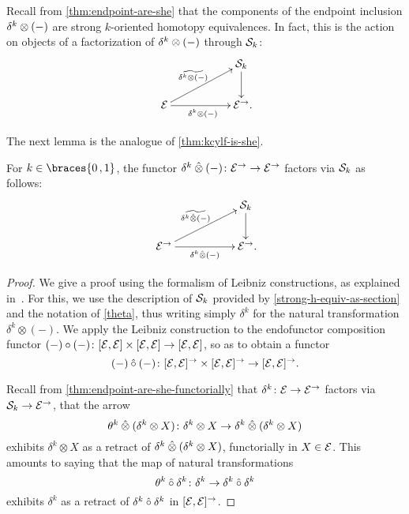 \documentclass[reqno,10pt,a4paper,oneside,draft]{amsart}
\begin{document}
{{\begin{remark} \label{thm:endpoint-are-she-functorially}
Recall from \cref{thm:endpoint-are-she} that the components of the endpoint inclusion $\kcyl \otimes (-)$ are strong $k$-oriented homotopy equivalences.
In fact, this is the action on objects of a factorization of $\kcyl \otimes (-)$ through $\cal{S}_k$:
\[
\xymatrix@C+3em{
&
  \cal{S}_k
  \ar[d]
\\
  \cal{E}
  \ar[r]_{\kcyl \otimes (-)}
  \ar[ur]^{\widetilde{\kcyl \otimes (-)}}
&
  \cal{E}^\to
\rlap{.}}
\]
\end{remark}

The next lemma is the analogue of \cref{thm:kcylf-is-she}.

\begin{lemma} \label{thm:kcylf-is-she-alg}
For $k \in \braces{0\,, 1}$, the functor $\kcyl \hatotimes (-) \co \cal{E}^\to \to \cal{E}^\to$ factors via $\cal{S}_k$ as follows:
\[
\xymatrix@C+3em{
&
  \cal{S}_k
  \ar[d]
\\
  \cal{E}^\to
  \ar[r]_-{\kcyl \hatotimes (-)}
  \ar[ur]^-{\widetilde{\kcyl \hatotimes (-)}\,}
&
  \cal{E}^\to
\rlap{.}}
\]
\end{lemma}

\begin{proof} We give a proof using the formalism of Leibniz constructions, as explained in~\cite{riehl-verity:reedy}.
For this, we use the description of $\cal{S}_k$ provided by \cref{strong-h-equiv-as-section} and the notation of \cref{theta},
thus writing simply $\delta^k$ for the natural transformation $\delta^k \otimes (-)$.
We apply the Leibniz construction to the endofunctor composition functor
$(-) \cc (-) \co [\cal{E}, \cal{E}] \times [\cal{E}, \cal{E}] \to [\cal{E}, \cal{E}]$, so as to obtain a functor
\[
(-) \mathbin{\hat{\cc}} (-) \co [\cal{E}, \cal{E}]^\to \times [\cal{E}, \cal{E}]^\to \to [\cal{E}, \cal{E}]^\to
.\]

Recall from \cref{thm:endpoint-are-she-functorially} that $\delta^k \co \cal{E} \to \cal{E}^\to$ factors via $\cal{S}_k \to \cal{E}^\to$, \ie that
the arrow
\[
\theta^k \hatotimes (\delta^k \otimes X) \co \delta^k \otimes X \to \delta^k \hatotimes (\delta^k \otimes X)
\]
exhibits $\delta^k \otimes X$ as a retract of $\delta^k \hatotimes (\delta^k \otimes X)$, functorially in $X \in \cal{E}$.
This amounts to saying that the map of natural transformations
\[
\theta^k \mathbin{\hat{\cc}} \delta^k \co \delta^k \to \delta^k \mathbin{\hat{\cc}} \delta^k
\]
exhibits $\delta^k$ as a retract of $\delta^k \mathbin{\hat{\cc}} \delta^k$ in $[\cal{E}, \cal{E}]^\to$.


\end{proof}}}
\end{document}
